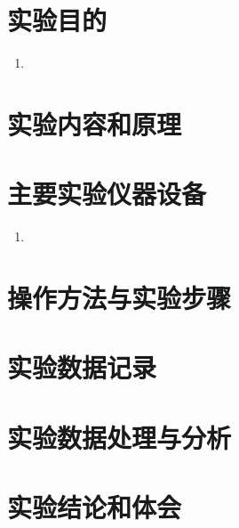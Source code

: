 \def\Major{机械工程}
\def\StudentName{陈思睿}
\def\StudentID{319010XXXX}
\def\CourseName{电工电子学实验}
\def\Teacher{熊素铭}
\def\ProjectName{集成运算放大器应用（一）}
\def\ProjectType{基础实验}
\def\Date{2021.5.10}
\def\Address{东三214}



\section{实验目的}

\begin{enumerate}[label=(\arabic*)]
	\item
\end{enumerate}

\section{实验内容和原理}

\section{主要实验仪器设备}

\begin{enumerate}[label=(\arabic*)]
	\item
\end{enumerate}

\section{操作方法与实验步骤}

\section{实验数据记录}

\section{实验数据处理与分析}

\section{实验结论和体会}


